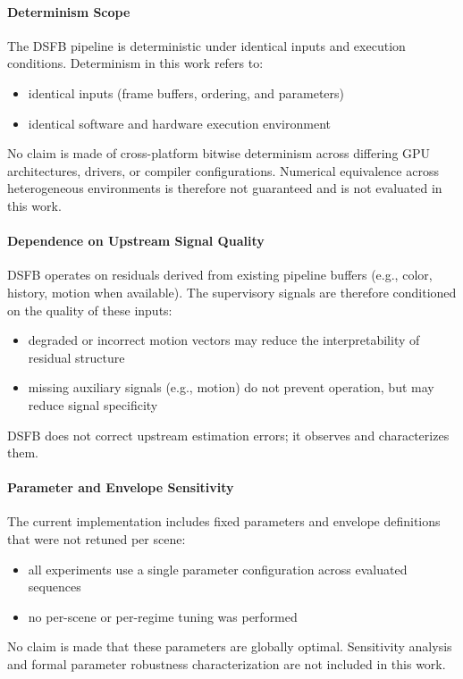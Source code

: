 \documentclass[11pt,letterpaper]{article}
\theoremstyle{gcresult}
\theoremstyle{definition}
\begin{document}
\paragraph{Determinism Scope}
The DSFB pipeline is deterministic under identical inputs and execution conditions. Determinism in this work refers to:
\begin{itemize}
    \item identical inputs (frame buffers, ordering, and parameters)
    \item identical software and hardware execution environment
\end{itemize}
No claim is made of cross-platform bitwise determinism across differing GPU architectures, drivers, or compiler configurations. Numerical equivalence across heterogeneous environments is therefore not guaranteed and is not evaluated in this work.

\paragraph{Dependence on Upstream Signal Quality}
DSFB operates on residuals derived from existing pipeline buffers (e.g., color, history, motion when available). The supervisory signals are therefore conditioned on the quality of these inputs:
\begin{itemize}
    \item degraded or incorrect motion vectors may reduce the interpretability of residual structure
    \item missing auxiliary signals (e.g., motion) do not prevent operation, but may reduce signal specificity
\end{itemize}
DSFB does not correct upstream estimation errors; it observes and characterizes them.

\paragraph{Parameter and Envelope Sensitivity}
The current implementation includes fixed parameters and envelope definitions that were not retuned per scene:
\begin{itemize}
    \item all experiments use a single parameter configuration across evaluated sequences
    \item no per-scene or per-regime tuning was performed
\end{itemize}
No claim is made that these parameters are globally optimal. Sensitivity analysis and formal parameter robustness characterization are not included in this work.
\end{document}
